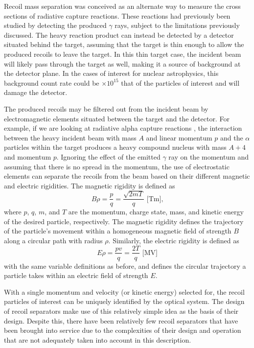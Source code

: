 Recoil mass separation was conceived as an alternate way to measure the
cross sections of radiative capture reactions. These reactions had
previously been studied by detecting the produced $\gamma$ rays, subject
to the limitations previously discussed. The heavy reaction product can
instead be detected by a detector situated behind the target, assuming
that the target is thin enough to allow the produced recoils to leave
the target. In this thin target case, the incident beam will likely pass
through the target as well, making it a source of background at the
detector plane. In the cases of interest for nuclear astrophysics, this
background count rate could be $\times 10^{15}$ that of the particles of
interest and will damage the detector.

The produced recoils may be filtered out from the incident beam by
electromagnetic elements situated between the target and the detector.
For example, if we are looking at radiative alpha capture reactions
, the interaction between the heavy incident
beam with mass $A$ and linear momentum $p$ and the $\alpha$ particles
within the target produces a heavy compound nucleus with mass $A + 4$
and momentum $p$. Ignoring the effect of the emitted $\gamma$ ray on the
momentum and assuming that there is no spread in the momentum, the use
of electrostatic elements can separate the recoils from the beam based
on their different magnetic and electric rigidities. The magnetic
rigidity is defined as
\begin{equation}
    \label{eq:brho}
    B\rho = \frac{p}{q} = \frac{\sqrt{2mT}}{q}\textrm{ [Tm],}
\end{equation}
where $p$, $q$, $m$, and $T$ are the momentum, charge state, mass, and
kinetic energy of the desired particle, respectively. The magnetic
rigidity defines the trajectory of the particle's movement within a
homogeneous magnetic field of strength $B$ along a circular path with
radius $\rho$. Similarly, the electric rigidity is defined as
\begin{equation}
    \label{eq:erho}
    E\rho = \frac{pv}{q} = \frac{2T}{q}\textrm{ [MV]}
\end{equation}
with the same variable definitions as before, and defines the circular
trajectory a particle takes within an electric field of strength $E$.

With a single momentum and velocity (or kinetic energy) selected for,
the recoil particles of interest can be uniquely identified by the
optical system. The design of recoil separators make use of this
relatively simple idea as the basis of their design. Despite this, there
have been relatively few recoil separators that have been brought into
service due to the complexities of their design and operation that are
not adequately taken into account in this description.

